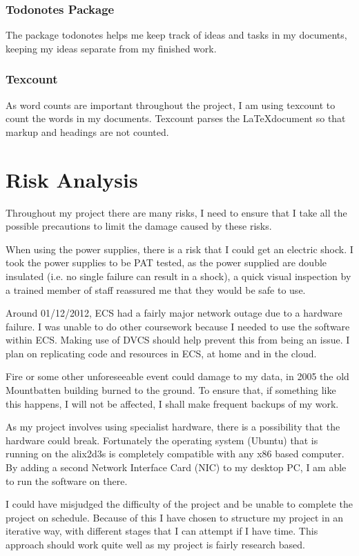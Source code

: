 \documentclass[12pt]{report}
\begin{document}
\subsubsection{Todonotes Package}
The package todonotes helps me keep track of ideas and tasks in my documents,
keeping my ideas separate from my finished work.

\subsubsection{Texcount}
As word counts are important throughout the project, I am using texcount to
count the words in my documents. Texcount parses the \LaTeX document so that
markup and headings are not counted.

\section{Risk Analysis}
Throughout my project there are many risks, I need to ensure that I take all the
possible precautions to limit the damage caused by these risks.

When using the power supplies, there is a risk that I could get an electric
shock. I took the power supplies to be PAT tested, as the power supplied are
double insulated (i.e. no single failure can result in a shock), a quick visual
inspection by a trained member of staff reassured me that they would be safe to
use. 

Around 01/12/2012, ECS had a fairly major network outage due to a hardware
failure. I was unable to do other coursework because I needed to use the
software within ECS. Making use of DVCS should help prevent this from being an
issue. I plan on replicating code and resources in ECS, at home and in the
cloud. 

Fire or some other unforeseeable event could damage to my data, in 2005 the old
Mountbatten building burned to the ground. To ensure that, if something like
this happens, I will not be affected, I shall make frequent backups of my work.

As my project involves using specialist hardware, there is a possibility that
the hardware could break. Fortunately the operating system (Ubuntu) that is
running on the alix2d3s is completely compatible with any x86 based computer. By
adding a second Network Interface Card (NIC) to my desktop PC, I am able to run
the software on there. 

I could have misjudged the difficulty of the project and be unable to complete
the project on schedule.  Because of this I have chosen to structure my project
in an iterative way, with different stages that I can attempt if I have time.
This approach should work quite well as my project is fairly research based. 
\end{document}

